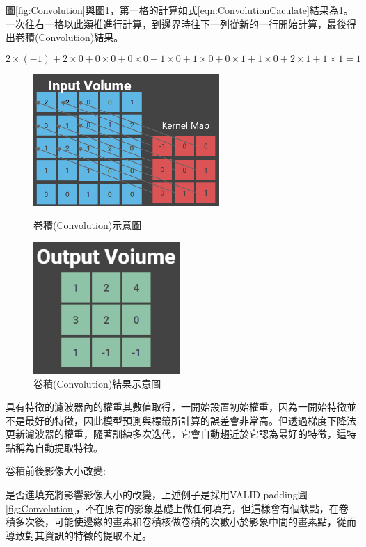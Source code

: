 %


圖\ref{fig:Convolution}與圖\ref{fig:ConvolutionFinally}，第一格的計算如式\ref{eqn:ConvolutionCaculate}結果為1。一次往右一格以此類推進行計算，到邊界時往下一列從新的一行開始計算，最後得出卷積(Convolution)結果。

\begin{equation}
	\label{eqn:ConvolutionCaculate}
	2\times(-1)+2\times0+0\times0+0\times0+1\times0+1\times0+0\times1+1\times0+2\times1+1\times1=1
\end{equation}


\begin{figure}[H]
	\centerline{\includegraphics[height=5cm]{pic/CNN1.png}}
	\caption{卷積(Convolution)示意圖}
	\label{fig:Convolution}

	\centerline{\includegraphics[height=5cm]{pic/CNN2.PNG}}
	\caption{卷積(Convolution)結果示意圖}
	\label{fig:ConvolutionFinally}
\end{figure}


\newpage
具有特徵的濾波器內的權重其數值取得，一開始設置初始權重，因為一開始特徵並不是最好的特徵，因此模型預測與標籤所計算的誤差會非常高。但透過梯度下降法更新濾波器的權重，隨著訓練多次迭代，它會自動趨近於它認為最好的特徵，這特點稱為自動提取特徵。


卷積前後影像大小改變:

是否進填充將影響影像大小的改變，上述例子是採用VALID padding圖\ref{fig:Convolution}，不在原有的影象基礎上做任何填充，但這樣會有個缺點，在卷積多次後，可能使邊緣的畫素和卷積核做卷積的次數小於影象中間的畫素點，從而導致對其資訊的特徵的提取不足。


